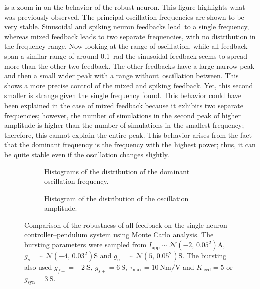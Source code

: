  is a zoom in on the behavior of the robust neuron.
This figure highlights what was previously observed. The principal oscillation frequencies are shown to be very stable.
Sinusoidal and spiking neuron feedbacks lead to a single frequency, whereas mixed feedback leads to two separate frequencies, with no distribution in the frequency range.
Now looking at the range of oscillation, while all feedback span a similar range of around \qty{0.1}{\radian} the sinusoidal feedback seems to spread more than the other two feedback.
The other feedbacks have a large narrow peak and then a small wider peak with a range without oscillation between.
This shows a more precise control of the mixed and spiking feedback.
Yet, this second smaller is strange given the single frequency found.
This behavior could have been explained in the case of mixed feedback because it exhibits two separate frequencies; however, the number of simulations in the second peak of higher amplitude is higher than the number of simulations in the smallest frequency; therefore, this cannot explain the entire peak.
This behavior arises from the fact that the dominant frequency is the frequency with the highest power; thus, it can be quite stable even if the oscillation changes slightly.

\begin{figure}[!htbp]
    \centering
    \begin{subfigure}[t]{\textwidth}
        \centering
        \caption{Histograms of the distribution of the dominant oscillation frequency.}
        \label{fig:single_monte_freq_robust}
    \end{subfigure}
    
    \begin{subfigure}[b]{\textwidth}
        \centering
        \caption{Histogram of the distribution of the oscillation amplitude.}
        \label{fig:single_monte_range_robust}
    \end{subfigure}
    \caption{Comparison of the robustness of all feedback on the single-neuron controller–pendulum system using Monte Carlo analysis. The bursting parameters were sampled from $I_\text{app} \sim \mathcal{N}\left(-2,\, 0.05^2\right) \unit{\ampere}$, $g_{s-} \sim \mathcal{N}\left(-4,\, 0.03^2\right) \unit{\siemens}$ and $g_{u+} \sim \mathcal{N}\left(5,\, 0.05^2\right) \unit{\siemens}$. The bursting also used $g_{f-} = \qty{-2}{\siemens}$, $g_{s+} = \qty{6}{\siemens}$, $\tau_\text{max} = \qty{10}{\newton\meter\per\volt}$ and $K_\text{feed} = 5$ or $g_{\text{syn}} = \qty{3}{\siemens}$.}
    \label{fig:single_monte_robust}
\end{figure}

